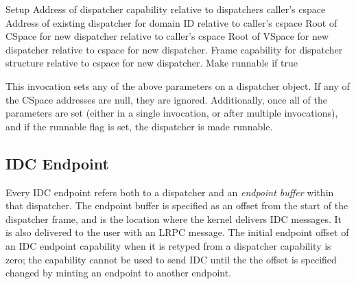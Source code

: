 \begin{invocation}{Setup}
 \arg Address of dispatcher capability relative to dispatchers caller's cspace
 \arg Address of existing dispatcher for domain ID relative to caller's cspace
 \arg Root of CSpace for new dispatcher relative to caller's cspace
 \arg Root of VSpace for new dispatcher relative to cspace for new dispatcher.
 \arg Frame capability for dispatcher structure relative to cspace for new dispatcher.
 \arg Make runnable if true
\end{invocation}
This invocation sets any of the above parameters on a dispatcher
object.  If any of the CSpace addresses are null, they are ignored.
Additionally, once all of the parameters are set (either in a single
invocation, or after multiple invocations), and if the runnable flag
is set, the dispatcher is made runnable.  

\subsection{IDC Endpoint}
    
Every IDC endpoint refers both to a dispatcher and an \emph{endpoint
  buffer} within that dispatcher. The endpoint buffer is specified as
an offset from the start of the dispatcher frame, and is the location
where the kernel delivers IDC messages. It is also delivered to the
user with an LRPC message.  The initial endpoint offset of an IDC
endpoint capability when it is retyped from a dispatcher capability is
zero; the capability cannot be used to send IDC until the the offset
is specified changed by minting an endpoint to another endpoint.

